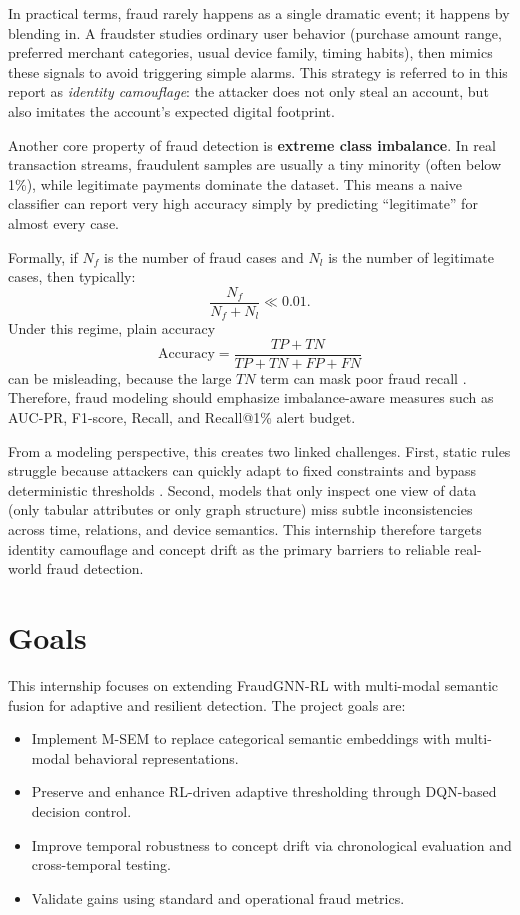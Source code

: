 \documentclass[12pt,a4paper]{report}
\begin{document}
In practical terms, fraud rarely happens as a single dramatic event; it happens by blending in. A fraudster studies ordinary user behavior (purchase amount range, preferred merchant categories, usual device family, timing habits), then mimics these signals to avoid triggering simple alarms. This strategy is referred to in this report as \emph{identity camouflage}: the attacker does not only steal an account, but also imitates the account's expected digital footprint.

Another core property of fraud detection is \textbf{extreme class imbalance}. In real transaction streams, fraudulent samples are usually a tiny minority (often below 1\%), while legitimate payments dominate the dataset. This means a naive classifier can report very high accuracy simply by predicting ``legitimate'' for almost every case.

Formally, if $N_f$ is the number of fraud cases and $N_l$ is the number of legitimate cases, then typically:
\[
\frac{N_f}{N_f+N_l} \ll 0.01.
\]
Under this regime, plain accuracy
\[
\mathrm{Accuracy}=\frac{TP+TN}{TP+TN+FP+FN}
\]
can be misleading, because the large $TN$ term can mask poor fraud recall \cite{saito_pr_imbalanced}. Therefore, fraud modeling should emphasize imbalance-aware measures such as AUC-PR, F1-score, Recall, and Recall@1\% alert budget.

From a modeling perspective, this creates two linked challenges. First, static rules struggle because attackers can quickly adapt to fixed constraints and bypass deterministic thresholds \cite{rule_based_fraud}. Second, models that only inspect one view of data (only tabular attributes or only graph structure) miss subtle inconsistencies across time, relations, and device semantics. This internship therefore targets identity camouflage and concept drift as the primary barriers to reliable real-world fraud detection.

\section{Goals}
This internship focuses on extending FraudGNN-RL with multi-modal semantic fusion for adaptive and resilient detection. The project goals are:
\begin{itemize}
    \item Implement M-SEM to replace categorical semantic embeddings with multi-modal behavioral representations.
    \item Preserve and enhance RL-driven adaptive thresholding through DQN-based decision control.
    \item Improve temporal robustness to concept drift via chronological evaluation and cross-temporal testing.
    \item Validate gains using standard and operational fraud metrics.
\end{itemize}
\end{document}

